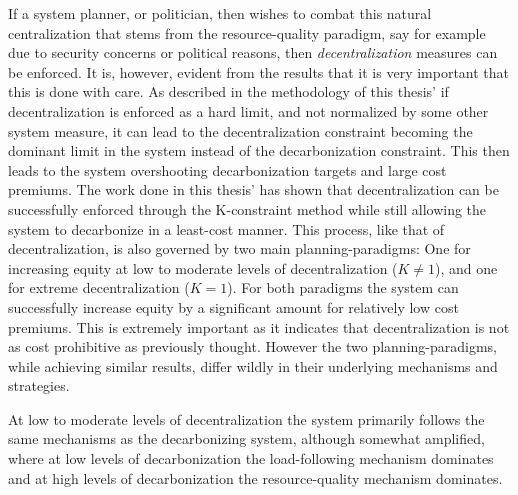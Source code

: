 \documentclass[preprint,12pt,nopreprintline]{elsarticle}
\begin{document}
\medskip
\noindent
If a system planner, or politician, then wishes to combat this natural centralization that stems from the resource-quality paradigm, say for example due to security concerns or political reasons, then \textit{decentralization} measures can be enforced. It is, however, evident from the results that it is very important that this is done with care. As described in the methodology of this thesis' if decentralization is enforced as a hard limit, and not normalized by some other system measure, it can lead to the decentralization constraint becoming the dominant limit in the system instead of the decarbonization constraint. This then leads to the system overshooting decarbonization targets and large cost premiums. The work done in this thesis' has shown that decentralization can be successfully enforced through the K-constraint method while still allowing the system to decarbonize in a least-cost manner. This process, like that of decentralization, is also governed by two main planning-paradigms: One for increasing equity at low to moderate levels of decentralization ($K\neq1$), and one for extreme decentralization ($K=1$). For both paradigms the system can successfully increase equity by a significant amount for relatively low cost premiums. This is extremely important as it indicates that decentralization is not as cost prohibitive as previously thought. However the two planning-paradigms, while achieving similar results, differ wildly in their underlying mechanisms and strategies.

\medskip
\noindent
At low to moderate levels of decentralization the system primarily follows the same mechanisms as the decarbonizing system, although somewhat amplified, where at low levels of decarbonization the load-following mechanism dominates and at high levels of decarbonization the resource-quality mechanism dominates.
\end{document}
